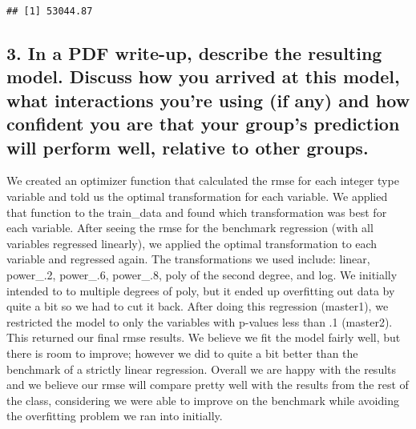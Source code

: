 \documentclass[]{article}
\begin{document}
\begin{verbatim}
## [1] 53044.87
\end{verbatim}

\hypertarget{in-a-pdf-write-up-describe-the-resulting-model.-discuss-how-you-arrived-at-this-model-what-interactions-youre-using-if-any-and-how-confident-you-are-that-your-groups-prediction-will-perform-well-relative-to-other-groups.}{%
\subsection{3. In a PDF write-up, describe the resulting model. Discuss
how you arrived at this model, what interactions you're using (if any)
and how confident you are that your group's prediction will perform
well, relative to other
groups.}\label{in-a-pdf-write-up-describe-the-resulting-model.-discuss-how-you-arrived-at-this-model-what-interactions-youre-using-if-any-and-how-confident-you-are-that-your-groups-prediction-will-perform-well-relative-to-other-groups.}}

We created an optimizer function that calculated the rmse for each
integer type variable and told us the optimal transformation for each
variable. We applied that function to the train\_data and found which
transformation was best for each variable. After seeing the rmse for the
benchmark regression (with all variables regressed linearly), we applied
the optimal transformation to each variable and regressed again. The
transformations we used include: linear, power\_.2, power\_.6,
power\_.8, poly of the second degree, and log. We initially intended to
to multiple degrees of poly, but it ended up overfitting out data by
quite a bit so we had to cut it back. After doing this regression
(master1), we restricted the model to only the variables with p-values
less than .1 (master2). This returned our final rmse results. We believe
we fit the model fairly well, but there is room to improve; however we
did to quite a bit better than the benchmark of a strictly linear
regression. Overall we are happy with the results and we believe our
rmse will compare pretty well with the results from the rest of the
class, considering we were able to improve on the benchmark while
avoiding the overfitting problem we ran into initially.
\end{document}
